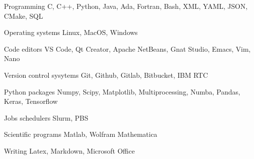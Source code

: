 

\begin{cvskills}

    \cvskill
    {Programming} %
    {C, C++, Python, Java, Ada, Fortran, Bash, XML, YAML, JSON, CMake, SQL} %

    \cvskill
    {Operating systems} %
    {Linux, MacOS, Windows} %

    \cvskill
    {Code editors} %
    {VS Code, Qt Creator, Apache NetBeans, Gnat Studio, Emacs, Vim, Nano} %

    \cvskill
    {Version control sysytems} %
    {Git, Github, Gitlab, Bitbucket, IBM RTC} %

    
    \cvskill
    {Python packages} %
    {Numpy, Scipy, Matplotlib, Multiprocessing, Numba, Pandas, Keras, Tensorflow}

    \cvskill
    {Jobs schedulers} %
    {Slurm, PBS}
    
    \cvskill
    {Scientific programs} %
    {Matlab, Wolfram Mathematica} %

    \cvskill
    {Writing} %
    {Latex, Markdown, Microsoft Office} %

\end{cvskills}